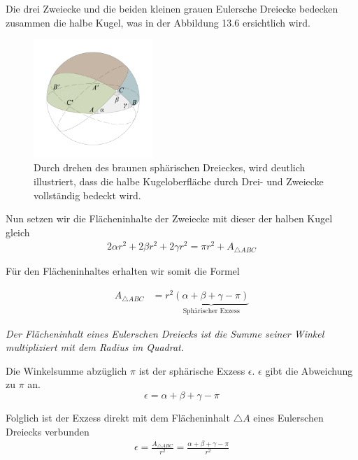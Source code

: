 \begin{refsection}
Die drei Zweiecke und die beiden kleinen grauen Eulersche Dreiecke bedecken zusammen die halbe Kugel, was in der Abbildung 13.6 ersichtlich wird.

\begin{figure}[htbp]
\centering
\includegraphics[width=0.4\textwidth]{kugel/HalbeKugel.jpg}
\caption{Durch drehen des braunen sphärischen Dreieckes, wird deutlich illustriert, dass die halbe Kugeloberfläche durch Drei- und Zweiecke vollständig bedeckt wird.}
\end{figure}

Nun setzen wir die Flächeninhalte der Zweiecke mit dieser der halben Kugel gleich
\begin{align*}
2 \alpha r^2 + 2 \beta r^2 + 2 \gamma  r^2 = \pi r^2 + A_{ \triangle{ ABC }}
\end{align*}

Für den Flächeninhaltes erhalten wir somit die Formel

\begin{align*}
A_{ \triangle{ ABC }}  &= r^{ 2 }\underbrace{(\alpha + \beta + \gamma - \pi)}_{\text{Sphärischer Exzess}}
\end{align*}

\begin{satz} \textit{Der Flächeninhalt eines Eulerschen Dreiecks ist die Summe seiner Winkel multipliziert mit dem Radius im Quadrat.}
\label{skript:kugel:satz:Flaecheninhalt}
\end{satz}


Die Winkelsumme abzüglich $\pi$ ist der sphärische Exzess $\epsilon$. $\epsilon$ gibt die Abweichung zu $\pi$ an.
\begin{equation}
\epsilon = \alpha + \beta + \gamma - \pi
\end{equation}


Folglich ist der Exzess direkt mit dem Flächeninhalt $\triangle A$ eines Eulerschen Dreiecks verbunden
\begin{align*}
\epsilon =\frac{A_{\triangle{ ABC }}}{r^2} = \frac{\alpha + \beta + \gamma - \pi}{r^2}
\end{align*}


\end{refsection}
